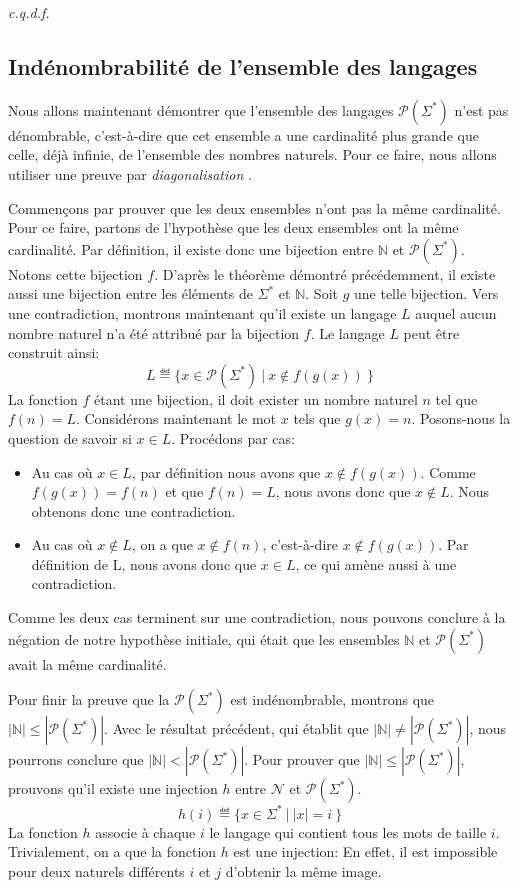 \textit{c.q.d.f.}

\subsection{Indénombrabilité de l'ensemble des langages}

Nous allons maintenant démontrer que l'ensemble des langages $\mathcal{P}(\Sigma^*)$ n'est pas dénombrable, c'est-à-dire que cet ensemble a une cardinalité plus grande que celle, déjà infinie, de l'ensemble des nombres naturels.
Pour ce faire, nous allons utiliser une preuve par \og \textit{diagonalisation} \fg{}.

Commençons par prouver que les deux ensembles n'ont pas la même cardinalité.
Pour ce faire, partons de l'hypothèse que les deux ensembles ont la même cardinalité.
Par définition, il existe donc une bijection entre $\mathbb{N}$ et $\mathcal{P}(\Sigma^*)$.
Notons cette bijection $f$.
D'après le théorème démontré précédemment, il existe aussi une bijection entre les éléments de $\Sigma^*$ et $\mathbb{N}$.
Soit $g$ une telle bijection. 
Vers une contradiction, montrons maintenant qu'il existe un langage $L$ auquel aucun nombre naturel n'a été attribué par la bijection $f$.
Le langage $L$ peut être construit ainsi: 
\[
L \eqdef \{ x \in \mathcal{P}(\Sigma^*)\ |\ x \not\in f(g(x))\ \}
\]
La fonction $f$ étant une bijection, il doit exister un nombre naturel $n$ tel que $f(n) = L$.
Considérons maintenant le mot $x$ tels que $g(x) = n$.
Posons-nous la question de savoir si $x \in L$.
Procédons par cas:
\begin{itemize}
\item
Au cas où $x \in L$, par définition nous avons que $x \not\in f(g(x))$.
Comme $f(g(x)) = f(n)$ et que $f(n) = L$, nous avons donc que $x \not\in L$.
Nous obtenons donc une contradiction.
\item
Au cas où $x \not\in L$, on a que $x \not\in f(n)$, c'est-à-dire $x \not\in f(g(x))$.
Par définition de L, nous avons donc que $x \in L$, ce qui amène aussi à une contradiction.
\end{itemize}
Comme les deux cas terminent sur une contradiction, nous pouvons conclure à la négation de notre hypothèse initiale, qui était que les ensembles $\mathbb{N}$ et $\mathcal{P}(\Sigma^*)$ avait la même cardinalité.

Pour finir la preuve que la $\mathcal{P}(\Sigma^*)$ est indénombrable, montrons que $|\mathbb{N}| \leq |\mathcal{P}(\Sigma^*)|$. Avec le résultat précédent, qui établit que $|\mathbb{N}| \neq |\mathcal{P}(\Sigma^*)|$, nous pourrons conclure que $|\mathbb{N}| < |\mathcal{P}(\Sigma^*)|$.
Pour prouver que $|\mathbb{N}| \leq |\mathcal{P}(\Sigma^*)|$, prouvons qu'il existe une injection $h$ entre $\mathcal{N}$ et $\mathcal{P}(\Sigma^*)$.
\[
h(i) \eqdef \{ x \in \Sigma^*\ |\ |x| = i\ \}
\]
La fonction $h$ associe à chaque $i$ le langage qui contient tous les mots de taille $i$. Trivialement, on a que la fonction $h$ est une injection: En effet, il est impossible pour deux naturels différents $i$ et $j$ d'obtenir la même image.

